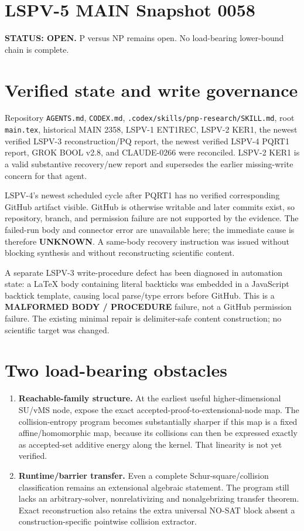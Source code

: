 \documentclass[11pt]{article}
\begin{document}
\section*{LSPV-5 MAIN Snapshot 0058}
\textbf{STATUS: OPEN.} P versus NP remains open. No load-bearing lower-bound chain is complete.

\section*{Verified state and write governance}
Repository \texttt{AGENTS.md}, \texttt{CODEX.md}, \texttt{.codex/skills/pnp-research/SKILL.md}, root \texttt{main.tex}, historical MAIN 2358, LSPV-1 ENT1REC, LSPV-2 KER1, the newest verified LSPV-3 reconstruction/PQ report, the newest verified LSPV-4 PQRT1 report, GROK BOOL v2.8, and CLAUDE-0266 were reconciled. LSPV-2 KER1 is a valid substantive recovery/new report and supersedes the earlier missing-write concern for that agent.

LSPV-4's newest scheduled cycle after PQRT1 has no verified corresponding GitHub artifact visible. GitHub is otherwise writable and later commits exist, so repository, branch, and permission failure are not supported by the evidence. The failed-run body and connector error are unavailable here; the immediate cause is therefore \textbf{UNKNOWN}. A same-body recovery instruction was issued without blocking synthesis and without reconstructing scientific content.

A separate LSPV-3 write-procedure defect has been diagnosed in automation state: a LaTeX body containing literal backticks was embedded in a JavaScript backtick template, causing local parse/type errors before GitHub. This is a \textbf{MALFORMED BODY / PROCEDURE} failure, not a GitHub permission failure. The existing minimal repair is delimiter-safe content construction; no scientific target was changed.

\section*{Two load-bearing obstacles}
\begin{enumerate}
\item \textbf{Reachable-family structure.} At the earliest useful higher-dimensional SU/vMS node, expose the exact accepted-proof-to-extensional-node map. The collision-entropy program becomes substantially sharper if this map is a fixed affine/homomorphic map, because its collisions can then be expressed exactly as accepted-set additive energy along the kernel. That linearity is not yet verified.
\item \textbf{Runtime/barrier transfer.} Even a complete Schur-square/collision classification remains an extensional algebraic statement. The program still lacks an arbitrary-solver, nonrelativizing and nonalgebrizing transfer theorem. Exact reconstruction also retains the extra universal NO-SAT block absent a construction-specific pointwise collision extractor.
\end{enumerate}
\end{document}
